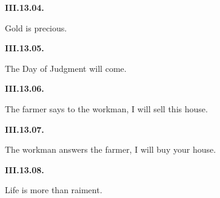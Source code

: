 \par\begin{minipage}{\linewidth}\raggedright
\textbf{III.13.04.}

Gold is precious.

\end{minipage}\par\addvspace{4pt}

\par\begin{minipage}{\linewidth}\raggedright
\textbf{III.13.05.}

The Day of Judgment will come.

\end{minipage}\par\addvspace{4pt}

\par\begin{minipage}{\linewidth}\raggedright
\textbf{III.13.06.}

The farmer says to the workman, I will sell this house.

\end{minipage}\par\addvspace{4pt}

\par\begin{minipage}{\linewidth}\raggedright
\textbf{III.13.07.}

The workman answers the farmer, I will buy your house.

\end{minipage}\par\addvspace{4pt}

\par\begin{minipage}{\linewidth}\raggedright
\textbf{III.13.08.}

Life is more than raiment.

\end{minipage}\par\addvspace{4pt}

